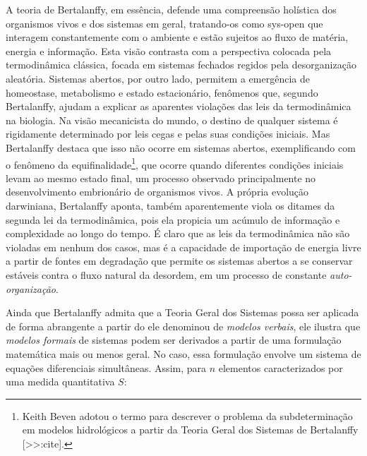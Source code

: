 \documentclass[./main.tex]{subfiles}
\begin{document}
\par A teoria de Bertalanffy, em essência, defende uma compreensão holística dos organismos vivos e dos sistemas em geral, tratando-os como \gls{sys-open} que interagem constantemente com o ambiente e estão sujeitos ao fluxo de matéria, energia e informação. Esta visão contrasta com a perspectiva colocada pela termodinâmica clássica, focada em sistemas fechados regidos pela desorganização aleatória. Sistemas abertos, por outro lado, permitem a emergência de homeostase, metabolismo e estado estacionário, fenômenos que, segundo Bertalanffy, ajudam a explicar as aparentes violações das leis da termodinâmica na biologia. Na visão mecanicista do mundo, o destino de qualquer sistema é rigidamente determinado por leis cegas e pelas suas condições iniciais. Mas Bertalanffy destaca que isso não ocorre em sistemas abertos, exemplificando com o fenômeno da equifinalidade\footnote{Keith Beven adotou o termo  para descrever o problema da subdeterminação em modelos hidrológicos a partir da Teoria Geral dos Sistemas de Bertalanffy [>>:cite].}, que ocorre quando diferentes condições iniciais levam ao mesmo estado final, um processo observado principalmente no desenvolvimento embrionário de organismos vivos. A própria evolução darwiniana, Bertalanffy aponta, também aparentemente viola os ditames da segunda lei da termodinâmica, pois ela propicia um acúmulo de informação e complexidade ao longo do tempo. É claro que as leis da termodinâmica não são violadas em nenhum dos casos, mas é a capacidade de importação de energia livre a partir de fontes em degradação que permite os sistemas abertos a se conservar estáveis contra o fluxo natural da desordem, em um processo de constante \textit{auto-organização}.

\par Ainda que Bertalanffy admita que a Teoria Geral dos Sistemas possa ser aplicada de forma abrangente a partir do ele denominou de \textit{modelos verbais}, ele ilustra que \textit{modelos formais} de sistemas podem ser derivados a partir de uma formulação matemática mais ou menos geral. No caso, essa formulação envolve um sistema de equações diferenciais simultâneas. Assim, para $n$ elementos caracterizados por uma medida quantitativa $S$:
\end{document}
